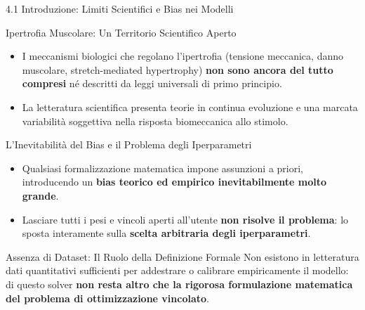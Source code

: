 \documentclass[aspectratio=169, 10pt]{beamer}
\begin{document}
\begin{frame}{4.1 Introduzione: Limiti Scientifici e Bias nei Modelli}
    \begin{block}{Ipertrofia Muscolare: Un Territorio Scientifico Aperto}
        \footnotesize
        \begin{itemize}
            \item I meccanismi biologici che regolano l'ipertrofia (tensione meccanica, danno muscolare, stretch-mediated hypertrophy) \textbf{non sono ancora del tutto compresi} né descritti da leggi universali di primo principio.
            \item La letteratura scientifica presenta teorie in continua evoluzione e una marcata variabilità soggettiva nella risposta biomeccanica allo stimolo.
        \end{itemize}
    \end{block}
    \vspace{-0.1cm}
    \begin{alertblock}{L'Inevitabilità del Bias e il Problema degli Iperparametri}
        \footnotesize
        \begin{itemize}
            \item Qualsiasi formalizzazione matematica impone assunzioni a priori, introducendo un \textbf{bias teorico ed empirico inevitabilmente molto grande}.
            \item Lasciare tutti i pesi e vincoli aperti all'utente \textbf{non risolve il problema}: lo sposta interamente sulla \textbf{scelta arbitraria degli iperparametri}.
        \end{itemize}
    \end{alertblock}
    \vspace{-0.1cm}
    \begin{exampleblock}{Assenza di Dataset: Il Ruolo della Definizione Formale}
        \footnotesize
        Non esistono in letteratura dati quantitativi sufficienti per addestrare o calibrare empiricamente il modello: di questo solver \textbf{non resta altro che la rigorosa formulazione matematica del problema di ottimizzazione vincolato}.
    \end{exampleblock}
\end{frame}
\end{document}
